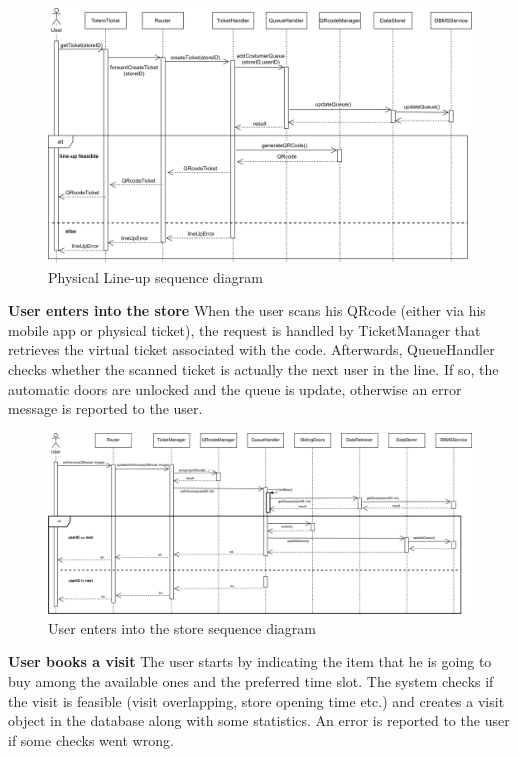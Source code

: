 \documentclass[]{article}
\begin{document}
	\begin{figure}[H]
		\centering
		\includegraphics[scale=0.6]{lineupphysicalSequence}
		\caption{Physical Line-up sequence diagram}
	\end{figure}

	\noindent
	\textbf{User enters into the store}
	\newline \newline
	When the user scans his QRcode (either via his mobile app or physical ticket), the request is handled by TicketManager that retrieves the virtual ticket associated with the code. \newline
	Afterwards, QueueHandler checks whether the scanned ticket is actually the next user in the line. 
	If so, the automatic doors are unlocked and the queue is update, otherwise an error message is reported to the user.
	\medskip
	
	\begin{figure}[H]
		\centering
		\includegraphics[scale=0.58]{ComponentView/userEnters.png}
		\caption{User enters into the store sequence diagram}
	\end{figure}
	
		\noindent
	\textbf{User books a visit}
	\newline \newline
	The user starts by indicating the item that he is going to buy among the available ones and the preferred time slot. \newline
	The system checks if the visit is feasible (visit overlapping, store opening time etc.) and creates a visit object in the database along with some statistics. An error is reported to the user if some checks went wrong.
	\medskip
	
\end{document}
